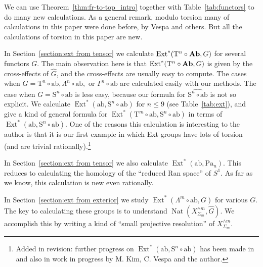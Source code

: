 \documentclass[psamsfonts]{amsart}
\theoremstyle{plain}
\theoremstyle{definition}
\theoremstyle{remark}
\newcommand{\catname}[1]{{\normalfont\textbf{#1}}}
\newcommand{\ab}{\catname{Ab}}
\newcommand{\abelianization}{\mathrm{ab}}
\newcommand{\tensor}{\mathrm{T}}
\newcommand{\symm}{\mathrm{S}}
\newcommand{\Passi}{\mathrm{Pa}}
\DeclareMathOperator{\ext}{Ext}
\DeclareMathOperator{\nat}{Nat}
\begin{document}
We can use Theorem~\ref{thm:fr-to-top_intro} together with Table~\ref{tab:functors} to do many new calculations. As a general remark, modulo torsion many of calculations in this paper were done before, by Vespa and others. But all the calculations of torsion in this paper are new. 

In Section~\ref{section:ext from tensor} we calculate $\ext^*(\tensor^n\circ\ab, G)$ for several functors $G$. The main observation here is that $\ext^*(\tensor^n\circ\ab, G)$ is given by the cross-effects of $\widehat G$, and the cross-effects are usually easy to compute. The cases when $G=\tensor^n\circ \abelianization, \Lambda^n\circ \abelianization,$ or $\Gamma^n\circ \abelianization$ are calculated easily with our methods. The case when $G=\symm^n\circ\abelianization$ is less easy, because our formula for $\widehat{\symm^n\circ\abelianization}$ is not so explicit. We calculate $\ext^*(\abelianization, \symm^n\circ\abelianization)$ for $n\le 9$ (see Table~\ref{tab:ext}), and give a kind of general formula for $\ext^*(\tensor^m\circ \abelianization, \symm^n\circ\abelianization)$ in terms of $\ext^*(\abelianization, \symm^n\circ\abelianization)$. One of the reasons this calculation is interesting to the author is that it is our first example in which Ext groups have lots of torsion (and are trivial rationally).\footnote{Added in revision: further progress on $\ext^*(\abelianization, \symm^n\circ\abelianization)$ has been made in~\cite{Kim-Vespa} and also in work in progress by M. Kim, C. Vespa and the author.} 

In Section~\ref{section:ext from tensor} we also calculate $\ext^*(\abelianization, \Passi_n)$. This reduces to calculating the homology of the ``reduced Ran space'' of $S^1$. As far as we know, this calculation is new even rationally.

In Section~\ref{section:ext from exterior} we study $\ext^*(\Lambda^m\circ\abelianization, G)$ for various $G$. The key to calculating these groups is to understand $\nat(X^{\wedge m}_{\Sigma_m}, \widehat G)$. We accomplish this by writing a kind of ``small projective resolution'' of $X^{\wedge m
}_{\Sigma_m}$.
\end{document}

